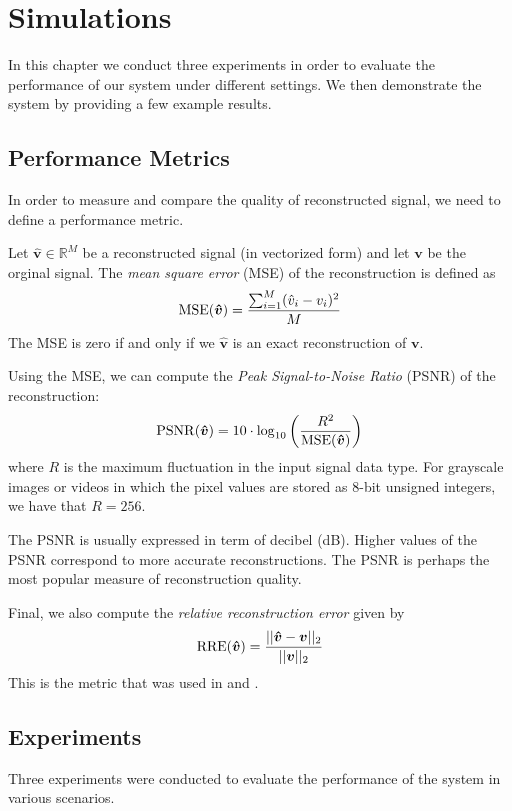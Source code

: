 \chapter{Simulations}
\label{ch:results}
In this chapter we conduct three experiments in order to evaluate the performance of our system under different settings.
We then demonstrate the system by providing a few example results.

\section{Performance Metrics}
In order to measure and compare the quality of reconstructed signal, we need to define a performance metric.

Let $\bm{\hat v} \in\mathbb{R}^M$ be a reconstructed signal (in vectorized form) and let $\bm v$ be the orginal signal.
The \emph{mean square error} (MSE) of the reconstruction is defined as
\begin{equation*}
  \operatorname*{MSE}(\bm{\hat v}) = \frac{\sum_{i=1}^M (\hat v_i - v_i)^2}{M}
\end{equation*}
The MSE is zero if and only if we $\bm{\hat v}$ is an exact reconstruction of $\bm v$.

Using the MSE, we can compute the \emph{Peak Signal-to-Noise Ratio} (PSNR) of the reconstruction:
\begin{equation*}
  \operatorname*{PSNR}(\bm{\hat v}) = 10 \cdot \log_{10} \left(\frac{R^2}{\operatorname*{MSE}(\bm{\hat v})}\right)
\end{equation*}
where $R$ is the maximum fluctuation in the input signal data type. 
For grayscale images or videos in which the pixel values are stored as 8-bit unsigned integers, we have that $R = 256$.

The PSNR is usually expressed in term of decibel (dB). 
Higher values of the PSNR correspond to more accurate reconstructions.
The PSNR is perhaps the most popular measure of reconstruction quality. 

Final, we also compute the \emph{relative reconstruction error} given by
\begin{equation*}
  \operatorname*{RRE}(\bm{\hat v}) = \frac{||\bm{\hat v} - \bm v||_2}{||\bm v||_2}
\end{equation*}
This is the metric that was used in \cite{ji2008} and \cite{pilikos2014}.

\section{Experiments}
Three experiments were conducted to evaluate the performance of the system in various scenarios.

